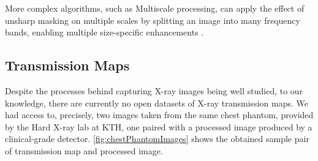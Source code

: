 \documentclass[nomenclature, english, bibtex]{kththesis}
\numberwithin{listing}{chapter}
\begin{document}
More complex algorithms, such as Multiscale processing, can apply the effect of unsharp masking on multiple scales
by splitting an image into many frequency bands, enabling multiple size-specific enhancements \cite[p.~156]{Prokop2003}.

\subsection{Transmission Maps}
\label{sec:transmissionMaps}

Despite the processes behind capturing X-ray images being well studied, to our knowledge, there are currently no open datasets of X-ray
transmission maps. We had access to, precisely, two images taken from the same chest phantom, provided by the Hard X-ray lab
at KTH, one paired with a processed image produced by a clinical-grade detector. \autoref{fig:chestPhantomImages} shows the obtained sample
pair of transmission map and processed image.
\end{document}
